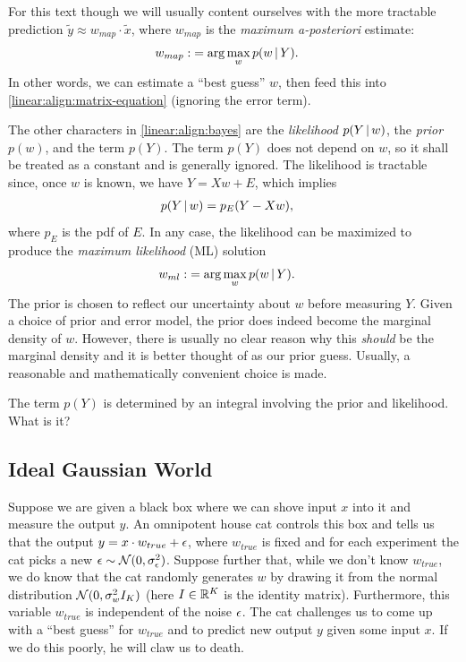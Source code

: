 For this text though we will usually content ourselves with the more tractable prediction $\tilde y \approx w_{map}\cdot \tilde x$, where $w_{map}$ is the \emph{maximum a-posteriori} estimate:
\begin{align*}
  w_{map} :&= \arg\max_w p(w{\,|\,} Y).
\end{align*}
In other words, we can estimate a ``best guess'' $w$, then feed this into \eqref{linear:align:matrix-equation} (ignoring the error term).

The other characters in \eqref{linear:align:bayes} are the \emph{likelihood} $p(Y{\,|\,} w)$, the \emph{prior} $p(w)$, and the term $p(Y)$.  The term $p(Y)$ does not depend on $w$, so it shall be treated as a constant and is generally ignored.  The likelihood is tractable since, once $w$ is known, we have $Y = X w + E$, which implies
\begin{align*}
  p(Y{\,|\,} w) &= p_E(Y - X w),
\end{align*}
where $p_E$ is the pdf of $E$.  In any case, the likelihood can be maximized to produce the \emph{maximum likelihood} (ML) solution
\begin{align*}
  w_{ml} :&= \arg\max_w p(w{\,|\,} Y).
\end{align*}
The prior is chosen to reflect our uncertainty about $w$ before measuring $Y$.  Given a choice of prior and error model, the prior does indeed become the marginal density of $w$.  However, there is usually no clear reason why this \emph{should} be the marginal density and it is better thought of as our prior guess.  Usually, a reasonable and mathematically convenient choice is made.

\begin{exercise}
  The term $p(Y)$ is determined by an integral involving the prior and likelihood.  What is it?
\end{exercise}

\subsection{Ideal Gaussian World}
\label{linear:subsection:gaussian-example}
Suppose we are given a black box where we can shove input $x$ into it and measure the output $y$.  An omnipotent house cat controls this box and tells us that the output $y=x\cdot w_{true} + {\epsilon}$, where $w_{true}$ is fixed and for each experiment the cat picks a new \iid ${\epsilon}\sim{\mathcal N}(0, \sigma^2_{\epsilon})$. Suppose further that, while we don't know $w_{true}$, we do know that the cat randomly generates $w$ by drawing it from the normal distribution ${\mathcal N}(0, \sigma^2_wI_K)$ (here $I\in{\mathbb R}^K$ is the identity matrix).  Furthermore, this variable $w_{true}$ is independent of the noise ${\epsilon}$.  The cat challenges us to come up with a ``best guess'' for $w_{true}$ and to predict new output $y$ given some input $x$.  If we do this poorly, he will claw us to death.

